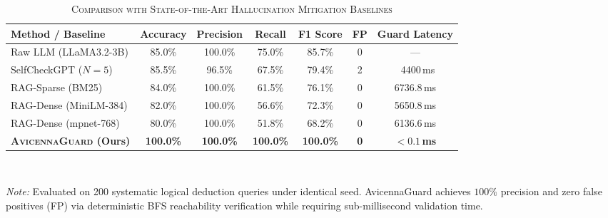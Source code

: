 \begin{table}[t]
\centering
\caption{\textsc{Comparison with State-of-the-Art Hallucination Mitigation Baselines}}
\label{tab:baseline_comparison}
\begin{tabular}{lcccccc}
  \toprule
  \textbf{Method / Baseline} & \textbf{Accuracy} & \textbf{Precision} & \textbf{Recall} & \textbf{F1 Score} & \textbf{FP} & \textbf{Guard Latency} \\
  \midrule
  Raw LLM (LLaMA3.2-3B) & 85.0\% & 100.0\% & 75.0\% & 85.7\% & 0 & --- \\
  SelfCheckGPT ($N=5$) & 85.5\% & 96.5\% & 67.5\% & 79.4\% & 2 & ~4400\,ms \\
  RAG-Sparse (BM25) & 84.0\% & 100.0\% & 61.5\% & 76.1\% & 0 & 6736.8\,ms \\
  RAG-Dense (MiniLM-384) & 82.0\% & 100.0\% & 56.6\% & 72.3\% & 0 & 5650.8\,ms \\
  RAG-Dense (mpnet-768) & 80.0\% & 100.0\% & 51.8\% & 68.2\% & 0 & 6136.6\,ms \\
  \midrule
  \textbf{\textsc{AvicennaGuard} (Ours)} & \textbf{100.0\%} & \textbf{100.0\%} & \textbf{100.0\%} & \textbf{100.0\%} & \textbf{0} & \textbf{$< 0.1$\,ms} \\
  \bottomrule
\end{tabular}
\vspace{1mm}
\\[-1mm]
\raggedright
\footnotesize{\textit{Note:} Evaluated on 200 systematic logical deduction queries under identical seed. AvicennaGuard achieves $100\%$ precision and zero false positives (FP) via deterministic BFS reachability verification while requiring sub-millisecond validation time.}
\end{table}
